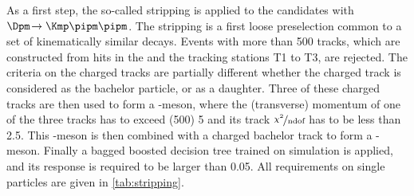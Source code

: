 As a first step, the so-called stripping is applied to the \BdToDpi candidates with \mbox{$\Dpm\!\to\Kmp\pipm\pipm$}.
The stripping is a first loose preselection common to a set of kinematically similar decays.
Events with more than \num{500} tracks, which are constructed from hits in the \velo and the tracking stations T1 to T3, are rejected.
The criteria on the charged tracks are partially different whether the charged track is considered as the bachelor particle, or as a \Dm daughter.
Three of these charged tracks are then used to form a \Dm-meson, where the (transverse) momentum of one of the three tracks has to exceed (\SI[per-mode=symbol]{500}{\MeVc}) \SI[per-mode=symbol]{5}{\GeVc} and its track $\nicefrac{\chi^2}{\text{ndof}}$ has to be less than \num{2.5}.
This \Dm-meson is then combined with a charged bachelor track to form a \Bz-meson.
Finally a bagged boosted decision tree trained on simulation is applied, and its response is required to be larger than \num{0.05}.
All requirements on single particles are given in \cref{tab:stripping}.
